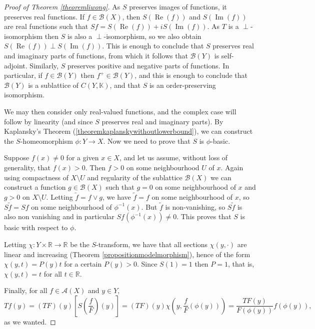 \documentclass[letter,11pt]{amsart}
\theoremstyle{plain}		\newtheorem{theorem}[generalnumbering]{Theorem}
\theoremstyle{plain}		\newtheorem{corollary}[generalnumbering]{Corollary}
\theoremstyle{definition}		\newtheorem{definition}[generalnumbering]{Definition}
\theoremstyle{definition}		\newtheorem{example}[generalnumbering]{Example}
\theoremstyle{plain}		\newtheorem{proposition}[generalnumbering]{Proposition}
\theoremstyle{plain}		\newtheorem{lemma}[generalnumbering]{Lemma}
\theoremstyle{definition}
\begin{document}
\begin{proof}[Proof of Theorem \ref{theoremliwong}]
	As $S$ preserves images of functions, it preserves real functions. If $f\in\mathcal{B}(X)$, then $S(\operatorname{Re}(f))$ and $S(\operatorname{Im}(f))$ are real functions such that $Sf=S(\operatorname{Re}(f))+iS(\operatorname{Im}(f))$. As $T$ is a $\perp$-isomorphism then $S$ is also a $\perp$-isomorphism, so we also obtain $S(\operatorname{Re}(f))\perp S(\operatorname{Im}(f))$. This is enough to conclude that $S$ preserves real and imaginary parts of functions, from which it follows that $\mathcal{B}(Y)$ is self-adjoint. Similarly, $S$ preserves positive and negative parts of functions. In particular, if $f\in\mathcal{B}(Y)$ then $f^+\in\mathcal{B}(Y)$, and this is enough to conclude that $\mathcal{B}(Y)$ is a sublattice of $C(Y,\mathbb{K})$, and that $S$ is an order-preserving isomorphism.
	
	We may then consider only real-valued functions, and the complex case will follow by linearity (and since $S$ preserves real and imaginary parts). By Kaplansky's Theorem (\ref{theoremkaplanskywithoutlowerbound}), we can construct the $S$-homeomorphism $\phi\colon Y\to X$. Now we need to prove that $S$ is $\phi$-basic.
	
	Suppose $f(x)\neq 0$ for a given $x\in X$, and let us assume, without loss of generality, that $f(x)>0$. Then $f>0$ on some neighbourhood $U$ of $x$. Again using compactness of $X\setminus U$ and regularity of the sublattice $\mathcal{B}(X)$ we can construct a function $g\in\mathcal{B}(X)$ such that $g=0$ on some neighbourhood of $x$ and $g>0$ on $X\setminus U$. Letting $\widetilde{f}=f\lor g$, we have $\widetilde{f}=f$ on some neighbourhood of $x$, so $S\widetilde{f}=Sf$ on some neighbourhood of $\phi^{-1}(x)$. But $\widetilde{f}$ is non-vanishing, so $S\widetilde{f}$ is also non vanishing and in particular $Sf(\phi^{-1}(x))\neq 0$. This proves that $S$ is basic with respect to $\phi$.
	
	Letting $\chi\colon Y\times\mathbb{R}\to\mathbb{R}$ be the $S$-transform, we have that all sections $\chi(y,\cdot)$ are linear and increasing (Theorem \ref{propositionmodelmorphism}), hence of the form $\chi(y,t)=P(y)t$ for a certain $P(y)>0$. Since $S(1)=1$ then $P=1$, that is, $\chi(y,t)=t$ for all $t\in\mathbb{R}$.
	
	Finally, for all $f\in\mathcal{A}(X)$ and $y\in Y$,
	\[Tf(y)=(TF)(y)\left[S\left(\frac{f}{F}\right)(y)\right]=(TF)(y)\chi\left(y,\frac{f}{F}(\phi(y))\right)=\frac{TF(y)}{F(\phi(y))}f(\phi(y)),\]
	as we wanted.
\end{proof}
\end{document}
